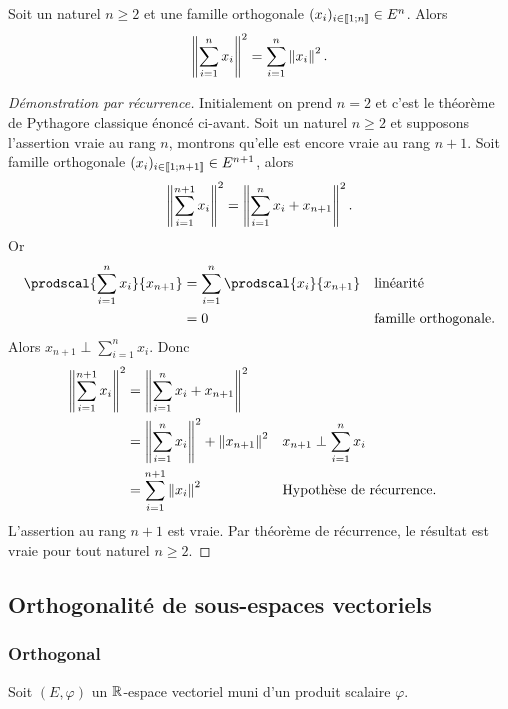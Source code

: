 \begin{theo}
  Soit un naturel $n\geq 2$ et une famille orthogonale $(x_i)_{i \in \mathopen{\llbracket}1\mathclose{}\mathpunct{};n\mathclose{\rrbracket}} \in E^n$. Alors
  \begin{equation}
    \left\lVert\sum_{i=1}^nx_i\right\rVert^2 = \sum_{i=1}^n \left\lVert x_i\right\rVert^2.
  \end{equation}
\end{theo}
\begin{proof}[Démonstration par récurrence]
  Initialement on prend $n=2$ et c'est le théorème de Pythagore classique énoncé ci-avant. Soit un naturel $n \ge 2$ et supposons l'assertion vraie au rang $n$, montrons qu'elle est encore vraie au rang $n+1$. Soit famille orthogonale $(x_i)_{i \in \mathopen{\llbracket}1\mathclose{}\mathpunct{};n+1\mathclose{\rrbracket}} \in E^{n+1}$, alors
  \begin{equation}
    \left\lVert\sum_{i=1}^{n+1}x_i\right\rVert^2 =  \left\lVert\sum_{i=1}^{n}x_i+x_{n+1}\right\rVert^2.
  \end{equation}
  Or
  \begin{align}
    \prodscal{\sum_{i=1}^{n}x_i}{x_{n+1}} &=\sum_{i=1}^{n}\prodscal{x_i}{x_{n+1}} && \text{linéarité} \\
    &=0 && \text{famille orthogonale}.
  \end{align}
  Alors $x_{n+1} \perp \sum_{i=1}^n x_i$. Donc
  \begin{align}
    \left\lVert\sum_{i=1}^{n+1}x_i\right\rVert^2 &=  \left\lVert\sum_{i=1}^{n}x_i+x_{n+1}\right\rVert^2 \\
    &=\left\lVert\sum_{i=1}^{n}x_i\right\rVert^2 + \left\lVert x_{n+1}\right\rVert^2 && x_{n+1} \perp \sum_{i=1}^n x_i \\
    &=\sum_{i=1}^{n+1}\left\lVert x_i\right\rVert^2 &&  \text{Hypothèse de récurrence}.
  \end{align}
  L'assertion au rang $n+1$ est vraie. Par théorème de récurrence, le résultat est vraie pour tout naturel $n \geq 2$.
\end{proof}

\subsection{Orthogonalité de sous-espaces vectoriels}

\subsubsection{Orthogonal}

Soit $(E,\varphi)$ un $\mathbb{R}$-espace vectoriel muni d'un produit scalaire $\varphi$.

